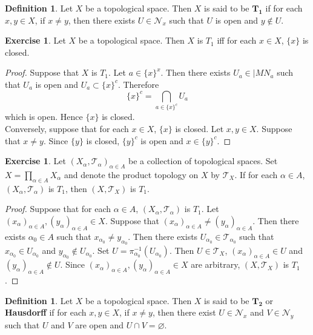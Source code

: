 \documentclass[12pt]{amsart}
\theoremstyle{definition}
\newtheorem{defn}[definition]{Definition}
\newtheorem{ex}[definition]{Exercise}
\newcommand{\al}{\alpha}
\newcommand{\MN}{\mathcal{N}}
\newcommand{\MT}{\mathcal{T}}
\newcommand{\tbf}[1]{\textbf{#1}}
\DeclareMathOperator*{\0}{\mbf{0}}
\DeclareMathOperator*{\1}{\mbf{1}}
\begin{document}
	\begin{defn}
		Let $X$ be a topological space. Then $X$ is said to be $\mathbf{T_1}$ if for each $x,y \in X$, if $x \neq y$, then there exists $U \in \MN_x$ such that $U$ is open and $y \not \in U$.
	\end{defn}
	
	\begin{ex}
		Let $X$ be a topological space. Then $X$ is $T_1$ iff for each $x \in X$, $\{x\}$ is closed. 
	\end{ex}
	
	\begin{proof}
		Suppose that $X$ is $T_1$. Let $a \in \{x\}^x$. Then there exists $U_{a} \in |MN_a$ such that $U_a$ is open and $U_{a} \subset \{x\}^c$. Therefore 
		$$\{x\}^c = \bigcap_{a \in \{x\}^c} U_a$$ 
		which is open. Hence $\{x\}$ is closed. \\
		Conversely, suppose that for each $x \in X$, $\{x\}$ is closed. Let $x, y \in X$. Suppose that $x \neq y$. Since $\{y\}$ is closed, $\{y\}^c$ is open and $x \in \{y\}^c$. 
	\end{proof}

	\begin{ex}
		Let $(X_{\al}, \MT_{\al})_{\al \in A}$ be a collection of topological spaces. Set $X = \prod\limits_{\al \in A} X_{\al}$ and denote the product topology on $X$ by $\MT_X$. If for each $\al \in A$, $(X_{\al}, \MT_{\al})$ is $T_1$, then $(X, \MT_X)$ is $T_1$.
	\end{ex}

	\begin{proof}
		Suppose that for each $\al \in A$, $(X_{\al}, \MT_{\al})$ is $T_1$. Let $(x_{\al})_{\al \in A}, (y_{\al})_{\al \in A} \in X$. Suppose that $(x_{\al})_{\al \in A} \neq (y_{\al})_{\al \in A}$. Then there exists $\al_0 \in A$ such that $x_{\al_0} \neq y_{\al_0}$. Then there exists $U_{\al_0} \in \MT_{\al_0}$ such that $x_{\al_0} \in U_{\al_0}$ and $y_{\al_0} \not \in U_{\al_0}$. Set $U = \pi_{\al_0}^{-1}(U_{\al_0})$. Then $U \in \MT_X$, $(x_{\al})_{\al \in A} \in U$ and $(y_{\al})_{\al \in A} \not \in U$. Since $(x_{\al})_{\al \in A}, (y_{\al})_{\al \in A} \in X$ are arbitrary, $(X, \MT_X)$ is $T_1$.
	\end{proof}
	
	\begin{defn}
		Let $X$ be a topological space. Then $X$ is said to be $\mathbf{T_2}$ or \tbf{Hausdorff} if for each $x,y \in X$, if $x \neq y$, then there exist $U \in \MN_x$ and $V \in \MN_y$ such that $U$ and $V$ are open and $U \cap V = \varnothing$.
	\end{defn}
	
\end{document}
